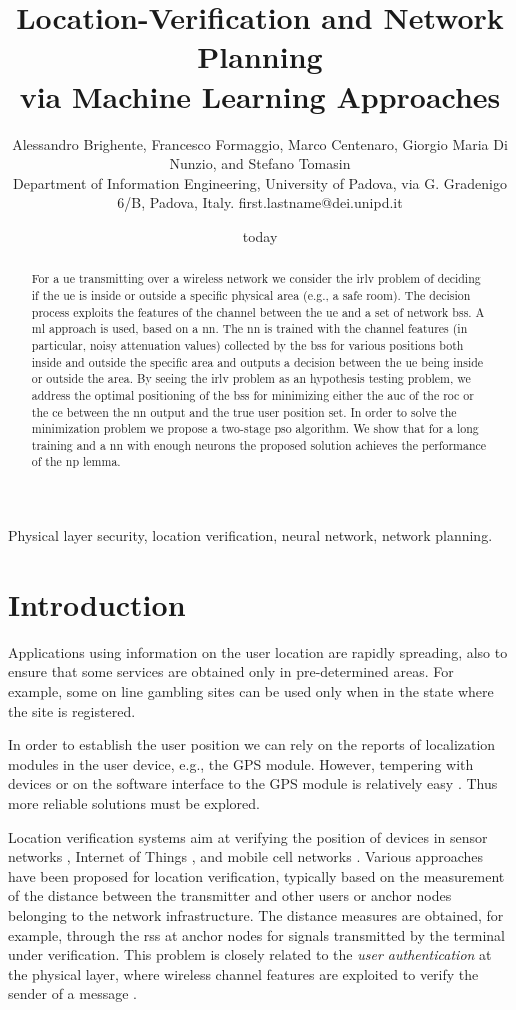 \documentclass[conference,final]{IEEEtran}
\title{Location-Verification and Network Planning \\ via Machine Learning Approaches}
\author{Alessandro Brighente, Francesco Formaggio, Marco Centenaro, Giorgio Maria Di Nunzio, and    Stefano Tomasin \\ {\small Department of Information Engineering, University of Padova, via G. Gradenigo 6/B, Padova, Italy. first.lastname@dei.unipd.it} }
\date{today}
\begin{document}
\maketitle

\begin{abstract}
For a \ac{ue} transmitting over a wireless network we consider the \ac{irlv} problem of deciding if the \ac{ue} is inside or outside a specific physical area (e.g., a safe room). The decision process exploits the features of the channel between the \ac{ue} and a set of network \acp{bs}. A  \ac{ml} approach is used, based on a \ac{nn}. The \ac{nn} is trained with the channel features (in particular, noisy attenuation values) collected by the \acp{bs} for various positions both inside and outside the specific area and outputs a decision between the \ac{ue} being inside or outside the area. By seeing the \ac{irlv} problem as an hypothesis testing problem, we address the optimal positioning of the \acp{bs} for minimizing either the \ac{auc} of the \ac{roc} or  the \ac{ce} between the \ac{nn} output and the true user position set. In order to solve the minimization problem we propose a two-stage \ac{pso} algorithm. We show that for a long training and a \ac{nn} with enough neurons the proposed solution achieves the performance of the \ac{np} lemma.
\end{abstract}

\begin{IEEEkeywords}
Physical layer security, location verification, neural network, network planning.
\end{IEEEkeywords}
\glsresetall

\section{Introduction}

Applications using information on the user location are rapidly spreading, also to ensure that some services are obtained only in pre-determined areas. For example, some on line gambling sites can be used only when in the state where the site is registered.

In order to establish the user position we can rely on the reports of localization modules in the user device, e.g., the GPS module. However, tempering with devices or on the software interface to the GPS module is relatively easy \cite{ceccato2018exploiting}. Thus more reliable solutions must be explored.

Location verification systems aim at verifying the position of devices in sensor networks \cite{Zeng-survey, 8376254}, Internet of Things \cite{7903611}, and mobile cell networks \cite{quaglia}. Various approaches have been proposed for location verification, typically based on the measurement of the distance between the transmitter and other users  or  anchor nodes belonging to the network infrastructure. The distance measures are obtained, for example, through the \ac{rss} at anchor nodes for signals transmitted by the terminal under verification.  This problem is closely related to the {\em user authentication} at the physical layer, where wireless channel features are exploited to verify the sender of a message \cite{7270404}.
\end{document}
